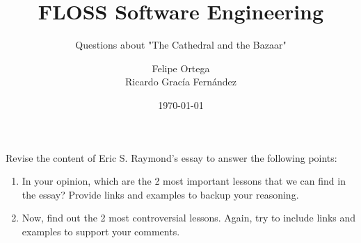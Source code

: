 \documentclass[11pt]{scrartcl}
\title{\textbf{FLOSS Software Engineering}}
\subtitle{Questions about "The Cathedral and the Bazaar"}
\author{Felipe Ortega\\
		Ricardo Grac\'ia Fern\'andez}
\date{\today}
\begin{document}
\maketitle

Revise the content of Eric S. Raymond's essay to answer the following points:
	\begin{enumerate}
		\item In your opinion, which are the 2 most important lessons that we can find in the essay? Provide links and examples to backup your reasoning.
		\item Now, find out the 2 most controversial lessons. Again, try to include links and examples to support your comments.
	\end{enumerate}
\end{document}
